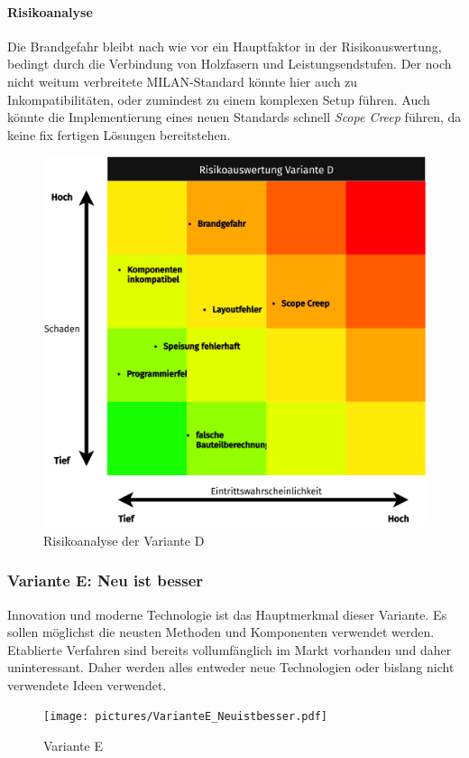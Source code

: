 \paragraph{Risikoanalyse}
Die Brandgefahr bleibt nach wie vor ein Hauptfaktor in der Risikoauswertung, bedingt durch die Verbindung von Holzfasern und Leistungsendstufen. Der noch nicht weitum verbreitete MILAN-Standard könnte hier auch zu Inkompatibilitäten, oder zumindest zu einem komplexen Setup führen. Auch könnte die Implementierung eines neuen Standards schnell \textit{Scope Creep} führen, da keine fix fertigen Lösungen bereitstehen.
\begin{figure}[H]
	\vspace{1cm}
	\centering
	\includegraphics[width=\textwidth*4/5]{pictures/risks-Variante D.png}
	\caption{Risikoanalyse der Variante D}
\end{figure}
\newpage
\subsubsection{Variante E: Neu ist besser}
Innovation und moderne Technologie ist das Hauptmerkmal dieser Variante. Es sollen möglichst die neusten Methoden und Komponenten verwendet werden. Etablierte Verfahren sind bereits vollumfänglich im Markt vorhanden und daher uninteressant. Daher werden alles entweder neue Technologien oder bislang nicht verwendete Ideen verwendet.
\begin{figure}[H]
	\centering
	\texttt{[image: pictures/VarianteE\_Neuistbesser.pdf]}
	\caption{Variante E}
\end{figure}
